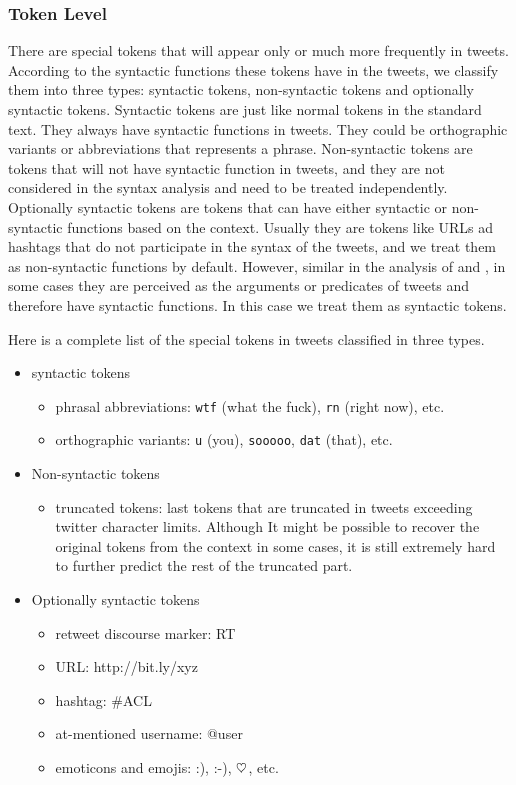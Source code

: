 \documentclass[11pt,letterpaper]{article}
\newcommand{\heart}{\ensuremath\heartsuit}
\begin{document}
\subsubsection{Token Level}

There are special tokens that will appear only or much more frequently in tweets. According to the syntactic functions these tokens have in the tweets, we classify them into three types: syntactic tokens, non-syntactic tokens and optionally syntactic tokens. 
Syntactic tokens are just like normal tokens in the standard text. They always have syntactic functions in tweets. They could be orthographic variants or abbreviations that represents a phrase.
Non-syntactic tokens are tokens that will not have syntactic function in tweets, and they are not considered in the syntax analysis and need to be treated independently.
Optionally syntactic tokens are tokens that can have either syntactic or non-syntactic functions based on the context. Usually they are tokens like URLs ad hashtags that do not participate in the syntax of the tweets, and we treat them as non-syntactic functions by default. However, similar in the analysis of  and , in some cases they are perceived as the arguments or predicates of tweets and therefore have syntactic functions. In this case we treat them as syntactic tokens.

Here is a complete list of the special tokens in tweets classified in three types.

\begin{itemize}
\item syntactic tokens
	\begin{itemize}
		\item phrasal abbreviations: {\tt wtf} (what the fuck), {\tt rn} (right now), etc.
		\item orthographic variants: {\tt u} (you), {\tt sooooo}, {\tt dat} (that), etc.
	\end{itemize}
\item Non-syntactic tokens
	\begin{itemize}
		\item truncated tokens: last tokens that are truncated in tweets exceeding twitter character limits. Although It might be possible to recover the original tokens from the context in some cases, it is still extremely hard to further predict the rest of the truncated part.
	\end{itemize}
\item Optionally syntactic tokens
	\begin{itemize}
		\item retweet discourse marker: RT
		\item URL: http://bit.ly/xyz
		\item hashtag: \#ACL
		\item at-mentioned username: @user
		\item emoticons and emojis: :), :-), $\heart$, etc.
	\end{itemize}
\end{itemize}
\end{document}
